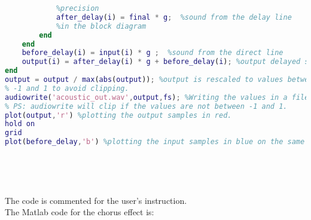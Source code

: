 \begin{lstlisting}[language=Matlab, caption= Matlab code for flanger effect]
	        %Making a linear approximation between the samples to increase
	        %precision
	        after_delay(i) = final * g;  %sound from the delay line
	        %in the block diagram 
	    end
	end
	before_delay(i) = input(i) * g ;  %sound from the direct line
	output(i) = after_delay(i) * g + before_delay(i); %output delayed signal 
end
output = output / max(abs(output)); %output is rescaled to values between
% -1 and 1 to avoid clipping. 
audiowrite('acoustic_out.wav',output,fs); %Writing the values in a file, 
% PS: audiowrite will clip if the values are not between -1 and 1. 
plot(output,'r') %plotting the output samples in red.
hold on
grid
plot(before_delay,'b') %plotting the input samples in blue on the same fig.






\end{lstlisting}


The code is commented for the user's instruction.\\

The Matlab code for the chorus effect is:

